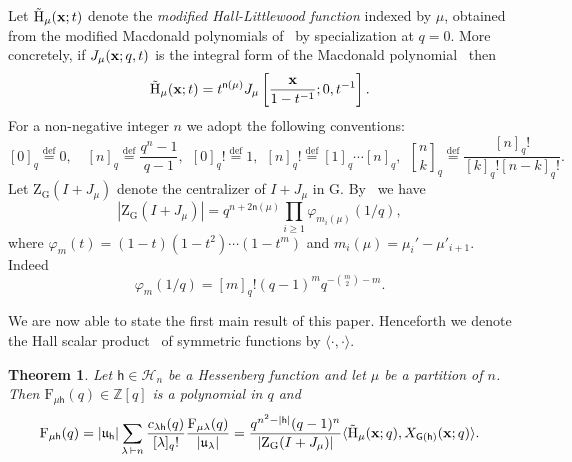 \documentclass[12pt,a4paper,reqno]{amsart}
\theoremstyle{plain}
\newtheorem{theorem}{Theorem}[section]
\theoremstyle{definition}
\newcommand{\defin}{\overset{\mathrm{def}}{=}}
\newcommand{\ZZ}{{\mathbb{Z}}}
\newcommand{\FF}{{\mathbb{F}}}
\newcommand{\1}{\mathds{1}}
\newcommand{\G}{{\mathrm{G}}}
\newcommand{\GL}{\mathrm{GL}}
\newcommand{\F}{\mathrm{F}}
\newcommand{\HH}{\mathrm{H}}
\newcommand{\cen}{\mathrm{Z}_\G}
\newcommand{\x}{{\bf x}}
\newcommand{\fn}{\mathsf{n}}
\newcommand{\hes}{\mathsf{h}}
\newcommand{\graph}{\mathsf{G}}
\begin{document}
Let  $\tilde{\HH}_\mu(\x;t)$ denote the \emph{modified Hall-Littlewood function} indexed by $\mu$,  obtained from the modified Macdonald polynomials of~\cite{HaglundHaimanLoehr} by specialization at $q=0$. More concretely, if  $J_\mu(\x;q,t)$ is the integral form of the Macdonald polynomial~\cite[p.~352, Eq.~(8.3)]{Macdonald} then
\[
\tilde{\HH}_\mu(\x;t)=t^{\fn(\mu)}
J_\mu\left[
\frac{\x}{1-t^{-1}};0,t^{-1}
\right].
\]
For a non-negative integer $n$ we adopt the following conventions:
\[
[0]_q\defin 0,\quad [n]_q \defin \frac{q^n-1}{q-1},\ \  [0]_q!\defin 1, \ \  [n]_q!\defin [1]_q\cdots [n]_q, \ \  {n \brack k}_q\defin \frac{[n]_q!}{[k]_q![n-k]_q!}. 
\]
Let $\cen(I+J_\mu)$ denote the centralizer of $I + J_\mu$ in $\G$. By~\cite[p. 181, Eq. (1.6)]{Macdonald} we have 
\begin{equation}\label{center_size1}
\left|\cen(I+J_\mu)\right|=q^{n+2\fn(\mu)}\prod_{i\geq 1}\varphi_{m_i(\mu)}\left(1/q\right),
\end{equation}
where $\varphi_m(t)=(1-t)(1-t^2)\cdots(1-t^m)$ and $m_i(\mu)=\mu_i'-\mu'_{i+1}$. Indeed
\begin{equation}\label{varphi_m}
\varphi_m\left(1/q\right)=[m]_q!(q-1)^mq^{-\binom{m}{2}-m}.
\end{equation}

We are now able to state the first main result of this paper. Henceforth we denote the Hall scalar product~\cite[Sec. I.4]{Macdonald} of symmetric functions by $\langle\cdot,\cdot\rangle$. 
 \begin{theorem}\label{Hess_theorem} Let $\hes\in \mathcal{H}_n$ be a Hessenberg function and let $\mu$ be a partition of $n$. Then $\F_{\mu\hes}(q)\in \ZZ[q]$ is a polynomial in $q$ and 
\begin{equation}\label{F_muh_Hall_inner}
      \F_{\mu \hes}(q)=|\mathfrak{u}_\hes|\sum_{\lambda\,\vdash n}\frac{c_{\lambda \hes}(q)}{[\lambda]_q!}\frac{\mathrm{F}_{\mu\lambda}(q)}{|\mathfrak{u}_\lambda|}=\frac{q^{n^2-|\hes|} (q-1)^n}{|\cen(I+J_\mu)|}\langle \tilde{\HH}_\mu(\x;q),X_{\graph(\hes)}(\x;q)\rangle.
\end{equation}    
\end{theorem}
\end{document}

